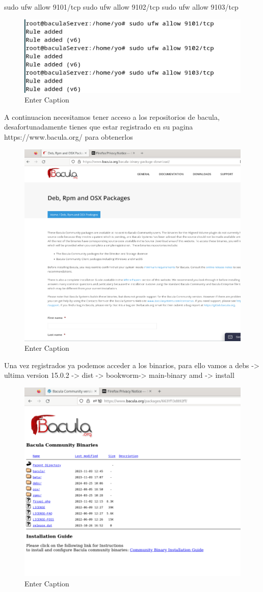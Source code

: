 sudo ufw allow 9101/tcp
sudo ufw allow 9102/tcp
sudo ufw allow 9103/tcp



\begin{figure}[H]
    \centering
    \includegraphics[width=0.5\linewidth]{instalacionBacula/puertosBaCULAufw.png}
    \caption{Enter Caption}
\end{figure}

A continuacion necesitamos tener acceso a los repositorios de bacula, desafortunadamente tienes que estar registrado en su pagina  https://www.bacula.org/ para obtenerlos

\begin{figure}[H]
    \centering
    \includegraphics[width=0.5\linewidth]{instalacionBacula/registroBacula.png}
    \caption{Enter Caption}
\end{figure}


Una vez registrados ya podemos acceder a los binarios, para ello vamos a 
debs -> ultima version 15.0.2 -> dist -> bookworm-> main-binary amd -> install


\begin{figure}[H]
    \centering
    \includegraphics[width=0.5\linewidth]{instalacionBacula/baculapackages.png}
    \caption{Enter Caption}
\end{figure}

